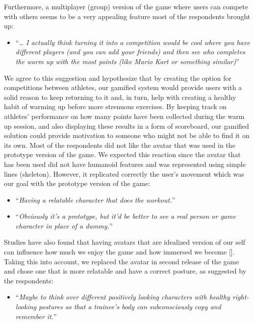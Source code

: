 Furthermore, a multiplayer (group) version of the game where users can compete with others seems to be a very appealing feature most of the respondents brought up: 
\begin{itemize}
\item ``\textit{… I actually think turning it into a competition would be cool where you have different players (and you can add your friends) and then see who completes the warm up with the most points (like Mario Kart or something similar)}''
\end{itemize}
We agree to this suggestion and hypothesize that by creating the option for competitions between athletes, our gamified system would provide users with a solid reason to keep returning to it and, in turn, help with creating a healthy habit of warming up before more strenuous exercises. By keeping track on athletes' performance on how many points have been collected during the warm up session, and also displaying these results in a form of scoreboard, our gamified solution could provide motivation to someone who might not be able to find it on its own.
Most of the respondents did not like the avatar that was used in the prototype version of the game. We expected this reaction since the avatar that has been used did not have humanoid features and was represented using simple lines (skeleton). However, it replicated correctly the user's movement which was our goal with the prototype version of the game: 
\begin{itemize}
\item ``\textit{Having a relatable character that does the workout.}''
\item ``\textit{Obviously it's a prototype, but it'd be better to see a real person or game character in place of a dummy.}''
\end{itemize}
Studies have also found that having avatars that are idealized version of our self can influence how much we enjoy the game and how immersed we become []. Taking this into account, we replaced the avatar in second release of the game and chose one that is more relatable and have a correct posture, as suggested by the respondents: 
\begin{itemize}
\item ``\textit{Maybe to think over different positively looking characters with healthy right-looking postures so that a trainee's body can subconsciously copy and remember it.}''
\end{itemize}
